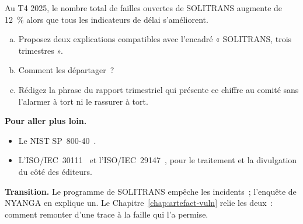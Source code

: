 \begin{boxexo}[title={\ding{45}\quad Exercice~11.4. Lire les indicateurs \niveauexpert}]
Au T4 2025, le nombre total de failles ouvertes de SOLITRANS augmente de
12~\% alors que tous les indicateurs de délai s'améliorent.
\begin{enumerate}[(a)]
    \item Proposez deux explications compatibles avec l'encadré « SOLITRANS,
          trois trimestres ».
    \item Comment les départager~?
    \item Rédigez la phrase du rapport trimestriel qui présente ce chiffre au
          comité sans l'alarmer à tort ni le rassurer à tort.
\end{enumerate}
\end{boxexo}

\bigskip

\begin{boxinfo}
\textbf{Pour aller plus loin.}
\begin{itemize}
    \item Le NIST SP~800-40~\cite{nist80040}.
    \item L'ISO/IEC~30111~\cite{iso30111} et l'ISO/IEC~29147~\cite{iso29147},
          pour le traitement et la divulgation du côté des éditeurs.
\end{itemize}
\end{boxinfo}

\begin{boxinfo}
\textbf{Transition.} Le programme de SOLITRANS empêche les incidents~;
l'enquête de NYANGA en explique un. Le Chapitre~\ref{chap:artefact-vuln}
relie les deux~: comment remonter d'une trace à la faille qui l'a permise.
\end{boxinfo}
